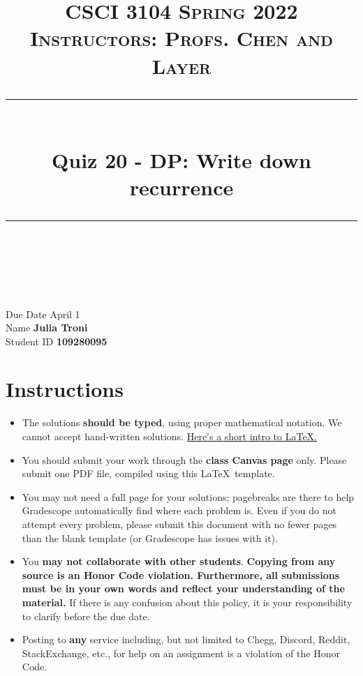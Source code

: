 \documentclass[11pt]{article}
\title{
\normalfont \normalsize 
\textsc{CSCI 3104 Spring 2022 \\ 
Instructors: Profs. Chen and Layer} \\
[10pt] 
\rule{\linewidth}{0.5pt} \\[6pt] 
\huge Quiz 20 - DP: Write down recurrence \\
\rule{\linewidth}{2pt}  \\[10pt]
}
\date{}
\theoremstyle{definition}
\theoremstyle{definition}
\theoremstyle{definition}
\begin{document}

\maketitle


\noindent
Due Date \dotfill April 1 \\
Name \dotfill \textbf{Julia Troni} \\
Student ID \dotfill \textbf{109280095} \\



\tableofcontents

\section{Instructions}
 \begin{itemize}
	\item The solutions \textbf{should be typed}, using proper mathematical notation. We cannot accept hand-written solutions. \href{http://ece.uprm.edu/~caceros/latex/introduction.pdf}{Here's a short intro to \LaTeX.}
	\item You should submit your work through the \textbf{class Canvas page} only. Please submit one PDF file, compiled using this \LaTeX \ template.
	\item You may not need a full page for your solutions; pagebreaks are there to help Gradescope automatically find where each problem is. Even if you do not attempt every problem, please submit this document with no fewer pages than the blank template (or Gradescope has issues with it).

	\item You \textbf{may not collaborate with other students}. \textbf{Copying from any source is an Honor Code violation. Furthermore, all submissions must be in your own words and reflect your understanding of the material.} If there is any confusion about this policy, it is your responsibility to clarify before the due date. 

	\item Posting to \textbf{any} service including, but not limited to Chegg, Discord, Reddit, StackExchange, etc., for help on an assignment is a violation of the Honor Code.
\end{itemize}
\end{document}
